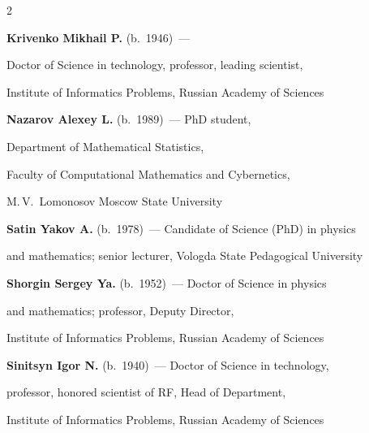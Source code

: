 \begin{multicols}{2}
\noindent

\textbf{Krivenko Mikhail P.} (b.\ 1946)~--- 

Doctor of Science in technology, professor, leading scientist, 

Institute of Informatics Problems, Russian Academy of Sciences  





\vspace*{4pt}



\noindent

\textbf{Nazarov Alexey L.} (b.\ 1989)~--- PhD student,

Department of Mathematical Statistics, 

Faculty of Computational Mathematics and Cybernetics, 

M.\,V.~Lomonosov Moscow State University



\vspace*{4pt}



\noindent

\textbf{Satin Yakov A.} (b.\ 1978)~--- Candidate of Science (PhD) in physics 

and mathematics; senior lecturer, Vologda State Pedagogical University



\vspace*{4pt}





\noindent

\textbf{Shorgin Sergey Ya.} (b.\ 1952)~--- Doctor of Science in physics 

and mathematics; professor, Deputy Director,

Institute of Informatics Problems, Russian Academy of Sciences



\vspace*{4pt}



\noindent

\textbf{Sinitsyn Igor N.} (b.\ 1940)~--- Doctor of Science in technology, 

professor, honored scientist of RF, Head of Department,

Institute of Informatics Problems, Russian Academy of Sciences




\end{multicols}
